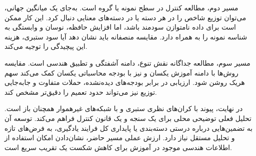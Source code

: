 مسیر دوم، مطالعه کنترل در سطح نمونه یا گروه است. به‌جای یک میانگین جهانی، می‌توان توزیع شاخص را در هر دسته یا در دسته‌های معنایی دنبال کرد. این کار ممکن است برای داده نامتوازن سودمند باشد، اما افزایش حافظه، نوسان و وابستگی به شناسه نمونه را به همراه دارد. مقایسه منصفانه باید نشان دهد آیا سود ستبری، هزینه این پیچیدگی را توجیه می‌کند.

مسیر سوم، مطالعه جداگانه نقش تنوع، دامنه آشفتگی و تطبیق هندسی است. مقایسه روش‌ها با دامنه آموزش یکسان و نیز با بودجه محاسباتی یکسان کمک می‌کند سهم هریک روشن شود. ارزیابی در برابر بودجه‌های دیده‌نشده، حملات متفاوت و جابه‌جایی توزیع نیز می‌تواند حدود تعمیم را دقیق‌تر مشخص کند.

در نهایت، پیوند با کران‌های نظری ستبری و با شبکه‌های غیرهموار همچنان باز است. تحلیل فعلی توضیحی محلی برای یک سنجه و یک قانون کنترل فراهم می‌کند. توسعه آن به تضمین‌هایی درباره درستی دسته‌بندی یا پایداری کل فرایند یادگیری، به فرض‌های تازه و تحلیل مستقل نیاز دارد. ارزش عملی مسیر حاضر، نشان‌دادن امکان استفاده از اطلاعات هندسی موجود در آموزش برای کاهش شکست یک تقریب سریع است.
